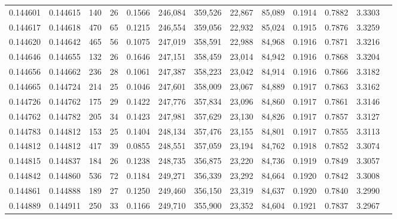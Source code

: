 \begin{tabular}{rrrrrrrrrrrrr}
0.144601 & 0.144615 &   140 &  26 &                                     0.1566 & 246,084 & 359,526 &  22,867 &  85,089 & 0.1914 & 0.7882 & 3.3303 \\
0.144617 & 0.144618 &   470 &  65 &                                     0.1215 & 246,554 & 359,056 &  22,932 &  85,024 & 0.1915 & 0.7876 & 3.3259 \\
0.144620 & 0.144642 &   465 &  56 &                                     0.1075 & 247,019 & 358,591 &  22,988 &  84,968 & 0.1916 & 0.7871 & 3.3216 \\
0.144646 & 0.144655 &   132 &  26 &                                     0.1646 & 247,151 & 358,459 &  23,014 &  84,942 & 0.1916 & 0.7868 & 3.3204 \\
0.144656 & 0.144662 &   236 &  28 &                                     0.1061 & 247,387 & 358,223 &  23,042 &  84,914 & 0.1916 & 0.7866 & 3.3182 \\
0.144665 & 0.144724 &   214 &  25 &                                     0.1046 & 247,601 & 358,009 &  23,067 &  84,889 & 0.1917 & 0.7863 & 3.3162 \\
0.144726 & 0.144762 &   175 &  29 &                                     0.1422 & 247,776 & 357,834 &  23,096 &  84,860 & 0.1917 & 0.7861 & 3.3146 \\
0.144762 & 0.144782 &   205 &  34 &                                     0.1423 & 247,981 & 357,629 &  23,130 &  84,826 & 0.1917 & 0.7857 & 3.3127 \\
0.144783 & 0.144812 &   153 &  25 &                                     0.1404 & 248,134 & 357,476 &  23,155 &  84,801 & 0.1917 & 0.7855 & 3.3113 \\
0.144812 & 0.144812 &   417 &  39 &                                     0.0855 & 248,551 & 357,059 &  23,194 &  84,762 & 0.1918 & 0.7852 & 3.3074 \\
0.144815 & 0.144837 &   184 &  26 &                                     0.1238 & 248,735 & 356,875 &  23,220 &  84,736 & 0.1919 & 0.7849 & 3.3057 \\
0.144842 & 0.144860 &   536 &  72 &                                     0.1184 & 249,271 & 356,339 &  23,292 &  84,664 & 0.1920 & 0.7842 & 3.3008 \\
0.144861 & 0.144888 &   189 &  27 &                                     0.1250 & 249,460 & 356,150 &  23,319 &  84,637 & 0.1920 & 0.7840 & 3.2990 \\
0.144889 & 0.144911 &   250 &  33 &                                     0.1166 & 249,710 & 355,900 &  23,352 &  84,604 & 0.1921 & 0.7837 & 3.2967 \\

\end{tabular}
